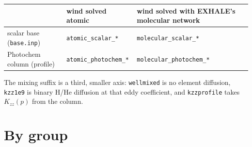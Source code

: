 \documentclass[11pt]{my_memo}
\begin{document}
\begin{center}
\footnotesize
\begin{tabular}{@{}l l l@{}}
\toprule
 & wind solved atomic & wind solved with EXHALE's molecular network\\
\midrule
scalar base (\texttt{base.inp}) & \texttt{atomic\_scalar\_*} & \texttt{molecular\_scalar\_*}\\
Photochem column (profile) & \texttt{atomic\_photochem\_*} & \texttt{molecular\_photochem\_*}\\
\bottomrule
\end{tabular}
\end{center}

\noindent
The mixing suffix is a third, smaller axis: \texttt{wellmixed} is no element
diffusion, \texttt{kzz1e9} is binary H/He diffusion at that eddy coefficient,
and \texttt{kzzprofile} takes $K_{zz}(p)$ from the column.

\section{By group}
\end{document}
